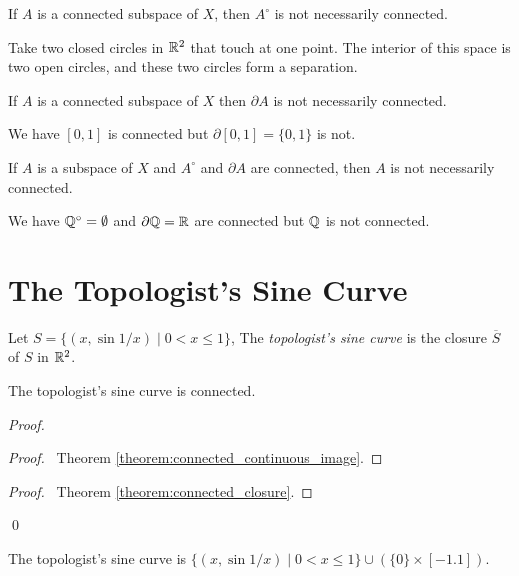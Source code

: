 \begin{example}
    If $A$ is a connected subspace of $X$, then $A^\circ$ is not necessarily connected.

    Take two closed circles in $\mathbb{R}^2$ that touch at one point. The interior of this space is
    two open circles, and these two circles form a separation.
\end{example}

\begin{example}
    If $A$ is a connected subspace of $X$ then $\partial A$ is not necessarily connected.

    We have $[0,1]$ is connected but $\partial [0,1] = \{ 0, 1 \}$ is not.
\end{example}

\begin{example}
    If $A$ is a subspace of $X$ and $A^\circ$ and $\partial A$ are connected, then $A$ is not necessarily connected.

    We have $\mathbb{Q}^\circ = \emptyset$ and $\partial \mathbb{Q} = \mathbb{R}$ are connected but $\mathbb{Q}$ is not connected.
\end{example}
\section{The Topologist's Sine Curve}

\begin{definition}
    Let $S = \{ (x, \sin 1/x) \mid 0 < x \leq 1 \}$, The \emph{topologist's sine curve} is the closure $\overline{S}$ of $S$ in $\mathbb{R}^2$.
\end{definition}

\begin{proposition}
    The topologist's sine curve is connected.
\end{proposition}

\begin{proof}
    \pf
    \begin{proof}
        \pf\ Theorem \ref{theorem:connected_continuous_image}.
    \end{proof}
    \begin{proof}
        \pf\ Theorem \ref{theorem:connected_closure}.
    \end{proof}
    \qed
\end{proof}

\begin{proposition}
    The topologist's sine curve is $\{ (x, \sin 1/x) \mid 0 < x \leq 1 \}
    \cup (\{0\} \times [-1.1])$.
\end{proposition}

